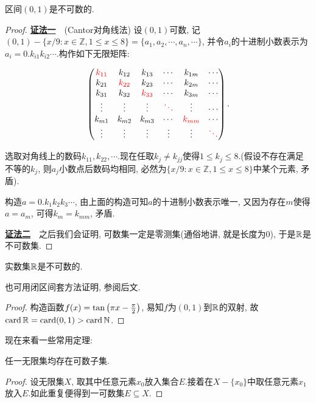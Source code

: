 \begin{proposition}{}
	区间$(0, 1)$是不可数的.
\end{proposition}
\begin{proof}
	\underline{\textbf{证法一}}~~(Cantor对角线法) 设$(0, 1)$可数, 记$(0, 1)-\{ x/9: x \in \mathbb{Z},  1 \leq x \leq 8 \}=\{ a_1,  a_2,  \cdots , a_n , \cdots \}$, 并令$a_i$的十进制小数表示为$a_i=0.k_{i1}k_{i2}\cdots$.构作如下无限矩阵: 
	
	$$\begin{pmatrix}
 \color{red} k_{11} & k_{12} & k_{13} & \cdots & k_{1m} & \cdots \\
 k_{21} & \color{red} k_{22} & k_{23} & \cdots & k_{2m} & \cdots \\
 k_{31} & k_{32} & \color{red} k_{33} & \cdots & k_{3m} & \cdots \\
 \vdots & \vdots & \vdots & \color{red} \ddots & \vdots & \cdots \\
 k_{m1} & k_{m2} & k_{m3} & \cdots & \color{red} k_{mm} & \cdots \\
 \vdots & \vdots & \vdots & \vdots & \vdots & \color{red} \ddots
\end{pmatrix}.$$

	选取对角线上的数码$k_{11}, k_{22}, \cdots $.现在任取$k_j \neq k_{jj}$使得$1 \leq k_j \leq 8$.(假设不存在满足不等的$k_j$, 则$a_j$小数点后数码均相同, 必然为$\{ x/9: x \in \mathbb{Z},  1 \leq x \leq 8 \}$中某个元素, 矛盾).
	
	构造$a=0.k_1k_2k_3\cdots$, 由上面的构造可知$a$的十进制小数表示唯一, 又因为存在$m$使得$a=a_m$, 可得$k_m=k_{mm}$, 矛盾.
	
	\underline{\textbf{证法二}}~~之后我们会证明, 可数集一定是零测集(通俗地讲, 就是长度为$0$), 于是$\mathbb{R}$是不可数集. 
\end{proof}



\begin{corollary}{}
	实数集$\mathbb{R}$是不可数的.
\end{corollary}
\begin{remark}
	也可用闭区间套方法证明, 参阅后文. 
\end{remark}
\begin{proof}
	构造函数$f(x)=\tan \left( \pi x-\frac{\pi}{2} \right)$, 易知$f$为$(0, 1)$到$\mathbb{R}$的双射, 故$\operatorname{card} \mathbb{R} = \operatorname{card} (0, 1) > \operatorname{card} \mathbb{N}$.
\end{proof}

现在来看一些常用定理: 

\begin{lemma}{}
	任一无限集均存在可数子集.
\end{lemma}
\begin{proof}
	设无限集$X$, 取其中任意元素$x_0$放入集合$E$.接着在$X-\{ x_0 \}$中取任意元素$x_1$放入$E$.如此重复便得到一可数集$E \subseteq X$.
\end{proof}

